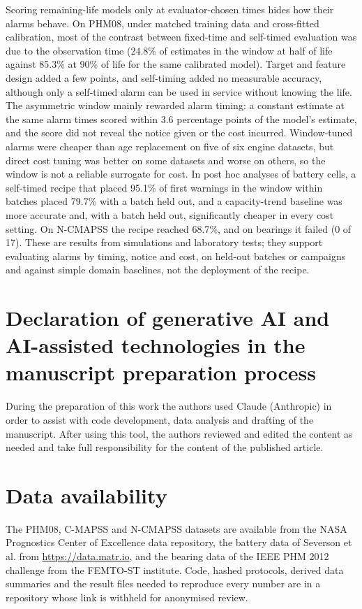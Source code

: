 \documentclass[a4paper,fleqn,doubleblind]{cas-dc}
\begin{document}
Scoring remaining-life models only at evaluator-chosen times hides how their alarms behave. On PHM08, under matched training data and cross-fitted calibration, most of the contrast between fixed-time and self-timed evaluation was due to the observation time (24.8\% of estimates in the window at half of life against 85.3\% at 90\% of life for the same calibrated model). Target and feature design added a few points, and self-timing added no measurable accuracy, although only a self-timed alarm can be used in service without knowing the life. The asymmetric window mainly rewarded alarm timing: a constant estimate at the same alarm times scored within 3.6 percentage points of the model's estimate, and the score did not reveal the notice given or the cost incurred. Window-tuned alarms were cheaper than age replacement on five of six engine datasets, but direct cost tuning was better on some datasets and worse on others, so the window is not a reliable surrogate for cost. In post hoc analyses of battery cells, a self-timed recipe that placed 95.1\% of first warnings in the window within batches placed 79.7\% with a batch held out, and a capacity-trend baseline was more accurate and, with a batch held out, significantly cheaper in every cost setting. On N-CMAPSS the recipe reached 68.7\%, and on bearings it failed (0 of 17). These are results from simulations and laboratory tests; they support evaluating alarms by timing, notice and cost, on held-out batches or campaigns and against simple domain baselines, not the deployment of the recipe.

\section*{Declaration of generative AI and AI-assisted technologies in the manuscript preparation process}

\noindent During the preparation of this work the authors used Claude (Anthropic) in order to assist with code development, data analysis and drafting of the manuscript. After using this tool, the authors reviewed and edited the content as needed and take full responsibility for the content of the published article.

\section*{Data availability}

\noindent The PHM08, C-MAPSS and N-CMAPSS datasets are available from the NASA Prognostics Center of Excellence data repository, the battery data of Severson et al. \cite{severson2019} from \url{https://data.matr.io}, and the bearing data of the IEEE PHM 2012 challenge \cite{nectoux2012} from the FEMTO-ST institute. Code, hashed protocols, derived data summaries and the result files needed to reproduce every number are in a repository whose link is withheld for anonymised review.
\end{document}
